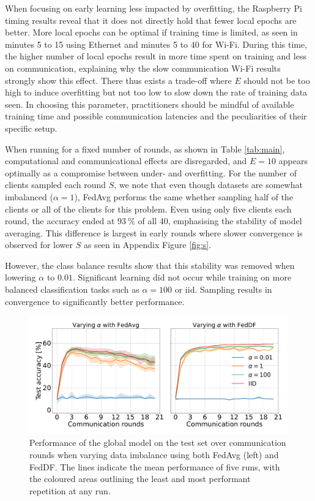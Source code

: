 \documentclass{article}
\newcommand{\unit}[1]{\ensuremath{\:\text{#1}}}
\newcommand{\pro}{\ensuremath{\unit{\%{}}}}
\begin{document}
When focusing on early learning less impacted by overfitting, the Raspberry Pi timing results reveal that it does not directly hold that fewer local epochs are better.
More local epochs can be optimal if training time is limited, as seen in minutes 5 to 15 using Ethernet and minutes 5 to 40 for Wi-Fi.
During this time, the higher number of local epochs result in more time spent on training and less on communication, explaining why the slow communication Wi-Fi results strongly show this effect.
There thus exists a trade-off where $E$ should not be too high to induce overfitting but not too low to slow down the rate of training data seen.
In choosing this parameter, practitioners should be mindful of available training time and possible communication latencies and the peculiarities of their specific setup.

When running for a fixed number of rounds, as shown in Table \ref{tab:main}, computational and communicational effects are disregarded, and $E=10$ appears optimally as a compromise between under- and overfitting.
For the number of clients sampled each round $S$, we note that even though datasets are somewhat imbalanced ($\alpha=1$), FedAvg performs the same whether sampling half of the clients or all of the clients for this problem.
Even using only five clients each round, the accuracy ended at $93 \pro$ of all 40, emphasising the stability of model averaging.
This difference is largest in early rounds where slower convergence is observed for lower $S$ as seen in Appendix Figure \ref{fig:s}.

However, the class balance results show that this stability was removed when lowering $\alpha$ to $0.01$. Significant learning did not occur while training on more balanced classification tasks such as $\alpha=100$ or iid. Sampling results in convergence to significantly better performance.

\begin{figure}[H]
    \centering
         \includegraphics[width=\linewidth]{imgs/feddf-alpha.pdf}
    \caption{
    Performance of the global model on the test set over communication rounds when varying data imbalance using both FedAvg (left) and FedDF.
    The lines indicate the mean performance of five runs, with the coloured areas outlining the least and most performant repetition at any run.
    }
    \label{fig:alpha}
\end{figure}\noindent
\end{document}
